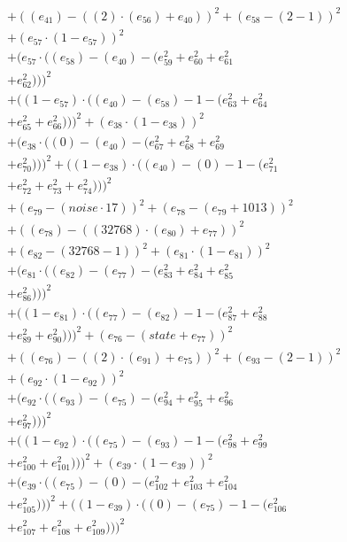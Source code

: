 \documentclass[10pt, a4paper]{article}
\begin{document}
\begin{align*}
& + ((e_{41}) - ((2)  \cdot  (e_{56}) + e_{40}))^{2} + (e_{58} - (2 - 1))^{2} \\
& + (e_{57}  \cdot  (1 - e_{57}))^{2} \\
& + (e_{57}  \cdot  ((e_{58}) - (e_{40}) - (e_{59}^{2} + e_{60}^{2} + e_{61}^{2} \\
& + e_{62}^{2})))^{2} \\
& + ((1 - e_{57})  \cdot  ((e_{40}) - (e_{58}) - 1 - (e_{63}^{2} + e_{64}^{2} \\
& + e_{65}^{2} + e_{66}^{2})))^{2} + (e_{38}  \cdot  (1 - e_{38}))^{2} \\
& + (e_{38}  \cdot  ((0) - (e_{40}) - (e_{67}^{2} + e_{68}^{2} + e_{69}^{2} \\
& + e_{70}^{2})))^{2} + ((1 - e_{38})  \cdot  ((e_{40}) - (0) - 1 - (e_{71}^{2} \\
& + e_{72}^{2} + e_{73}^{2} + e_{74}^{2})))^{2} \\
& + (e_{79} - (noise  \cdot  17))^{2} + (e_{78} - (e_{79} + 1013))^{2} \\
& + ((e_{78}) - ((32768)  \cdot  (e_{80}) + e_{77}))^{2} \\
& + (e_{82} - (32768 - 1))^{2} + (e_{81}  \cdot  (1 - e_{81}))^{2} \\
& + (e_{81}  \cdot  ((e_{82}) - (e_{77}) - (e_{83}^{2} + e_{84}^{2} + e_{85}^{2} \\
& + e_{86}^{2})))^{2} \\
& + ((1 - e_{81})  \cdot  ((e_{77}) - (e_{82}) - 1 - (e_{87}^{2} + e_{88}^{2} \\
& + e_{89}^{2} + e_{90}^{2})))^{2} + (e_{76} - (state + e_{77}))^{2} \\
& + ((e_{76}) - ((2)  \cdot  (e_{91}) + e_{75}))^{2} + (e_{93} - (2 - 1))^{2} \\
& + (e_{92}  \cdot  (1 - e_{92}))^{2} \\
& + (e_{92}  \cdot  ((e_{93}) - (e_{75}) - (e_{94}^{2} + e_{95}^{2} + e_{96}^{2} \\
& + e_{97}^{2})))^{2} \\
& + ((1 - e_{92})  \cdot  ((e_{75}) - (e_{93}) - 1 - (e_{98}^{2} + e_{99}^{2} \\
& + e_{100}^{2} + e_{101}^{2})))^{2} + (e_{39}  \cdot  (1 - e_{39}))^{2} \\
& + (e_{39}  \cdot  ((e_{75}) - (0) - (e_{102}^{2} + e_{103}^{2} + e_{104}^{2} \\
& + e_{105}^{2})))^{2} + ((1 - e_{39})  \cdot  ((0) - (e_{75}) - 1 - (e_{106}^{2} \\
& + e_{107}^{2} + e_{108}^{2} + e_{109}^{2})))^{2} \\

\end{align*}
\end{document}
